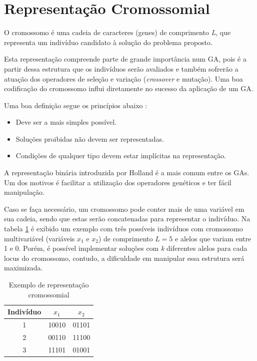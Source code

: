 	\section{Representação Cromossomial}

	O cromossomo é uma cadeia de caracteres (genes) de comprimento \textit{L}, que representa um indivíduo candidato à solução do problema proposto.
	
	Esta representação compreende parte de grande importância num GA, pois é a partir dessa estrutura que os indivíduos serão avaliados e também sofrerão a atuação dos operadores de seleção e variação (\textit{crossover} e mutação). Uma boa codificação do cromossomo influi diretamente no sucesso da aplicação de um GA.
	
	Uma boa definição segue os princípios abaixo \cite{Linden2008}:
	
	\begin{itemize}
		\item Deve ser a mais simples possível.
		\item Soluções proibidas não devem ser representadas. 
		\item Condições de qualquer tipo devem estar implícitas na representação.
	\end{itemize} 
	
	A representação binária introduzida por Holland é a mais comum entre os GAs. Um dos motivos é facilitar a utilização dos operadores genéticos e ter fácil manipulação.
	
	Caso se faça necessário, um cromossomo pode conter mais de uma variável em sua cadeia, sendo que estas serão concatenadas para representar o indivíduo. Na tabela \ref{tabCromo} é exibido um exemplo com três possíveis indivíduos com cromossomo multivariável (variáveis $x_1$ e $x_2$) de comprimento $L = 5$ e alelos que variam entre 1 e 0. Porém, é possível implementar soluções com \textit{k} diferentes alelos para cada locus do cromossomo, contudo, a dificuldade em manipular essa estrutura será maximizada.
		
	\begin{table}[htp]
 \caption{\label{tabCromo}Exemplo de representação cromossomial}
 \begin{center}
  \begin{tabular}{c|c|c}
   \hline
   Indivíduo & $x_1$  & $x_2$ \\
   \hline
   1 & 10010    & 01101 \\
   2 & 00110    & 11100 \\
   3 & 11101		& 01001 \\ 
   \hline
   \end{tabular}
 \end{center}
\end{table}


